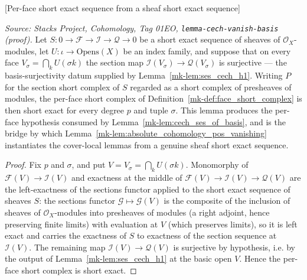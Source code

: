 \begin{lemma}

[Per-face short exact sequence from a sheaf short exact sequence]
  \label{mk-lem:face_ses_of_sheaf_ses}

  \textit{Source: Stacks Project, Cohomology, Tag 01EO,
  \texttt{lemma-cech-vanish-basis} (proof).}
  Let \(S : 0 \to \mathcal{F} \to \mathcal{I} \to \mathcal{Q} \to 0\) be a short exact sequence of
  sheaves of \(\mathcal{O}_X\)-modules, let \(U : \iota \to \mathrm{Opens}(X)\) be an index family,
  and suppose that on every face \(V_\sigma = \bigcap_k U(\sigma k)\) the section map
  \(\mathcal{I}(V_\sigma) \to \mathcal{Q}(V_\sigma)\) is surjective — the basis-surjectivity datum
  supplied by Lemma~\ref{mk-lem:ses_cech_h1}. Writing \(P\) for the section short complex of \(S\)
  regarded as a short complex of presheaves of modules, the per-face short complex of
  Definition~\ref{mk-def:face_short_complex} is then short exact for every degree \(p\) and tuple
  \(\sigma\). This lemma produces the per-face hypothesis consumed by
  Lemma~\ref{mk-lem:cech_ses_of_basis}, and is the bridge by which
  Lemma~\ref{mk-lem:absolute_cohomology_pos_vanishing} instantiates the cover-local lemmas from a
  genuine sheaf short exact sequence.
\end{lemma}
\begin{proof}
  Fix \(p\) and \(\sigma\), and put \(V = V_\sigma = \bigcap_k U(\sigma k)\). Monomorphy of
  \(\mathcal{F}(V) \to \mathcal{I}(V)\) and exactness at the middle of \(\mathcal{F}(V) \to
  \mathcal{I}(V) \to \mathcal{Q}(V)\) are the left-exactness of the sections functor applied to the
  short exact sequence of sheaves \(S\): the sections functor \(\mathcal{G} \mapsto \mathcal{G}(V)\)
  is the composite of the inclusion of sheaves of \(\mathcal{O}_X\)-modules into presheaves of
  modules (a right adjoint, hence preserving finite limits) with evaluation at \(V\) (which
  preserves limits), so it is left exact and carries the exactness of \(S\) to exactness of the
  section sequence at \(\mathcal{I}(V)\). The remaining map \(\mathcal{I}(V) \to \mathcal{Q}(V)\) is
  surjective by hypothesis, i.e. by the output of Lemma~\ref{mk-lem:ses_cech_h1} at the basic open
  \(V\). Hence the per-face short complex is short exact.
\end{proof}

